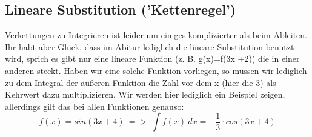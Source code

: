 \subsection{Lineare Substitution ('Kettenregel')}
	Verkettungen zu Integrieren ist leider um einiges komplizierter als beim
	Ableiten. Ihr habt aber Glück, dass im Abitur lediglich die lineare
	Substitution benutzt wird, sprich es gibt nur eine lineare Funktion (z. B.
	g(x)=f(3x +2)) die in einer anderen steckt. Haben wir eine solche Funktion
	vorliegen, so müssen wir lediglich zu dem Integral der äußeren Funktion die
	Zahl vor dem x (hier die 3) als Kehrwert dazu multiplizieren. Wir werden hier
	lediglich ein Beispiel zeigen, allerdings gilt das bei allen Funktionen
	genauso:
	\[f(x)=sin(3x+4)\ =>\ \int f(x)\ dx=-\frac{1}{3}\cdot cos(3x+4)\]
